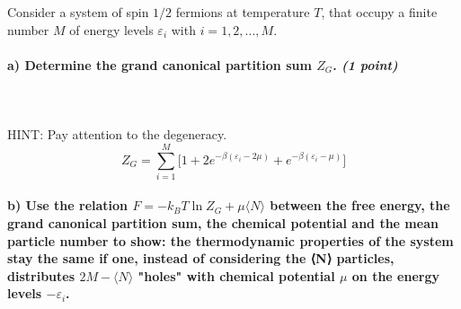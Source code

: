 Consider a system of spin $1/2$ fermions at temperature $T$, 
that occupy a finite number $M$ of energy levels 
$\varepsilon_i$ with $i=1,2,...,M$.


\paragraph{a) Determine the grand canonical partition sum $Z_G$.
    \textit{(1 point)}
} \ \\
    \\
    HINT: Pay attention to the degeneracy.
    \begin{equation}
        Z_G=
        \sum_{i=1}^M\bigg[
            1+2e^{
                -\beta(\varepsilon_i-2\mu)  %
            }+e^{
                -\beta(\varepsilon_i-\mu)
            }
        \bigg]
    \end{equation}

\paragraph{b) Use the relation $F=-k_BT\ln Z_G+\mu\langle N\rangle$
    between the free energy, the grand canonical partition 
    sum, the chemical potential and the mean particle number 
    to show: the thermodynamic properties of the system stay 
    the same if one, instead of considering the 
    ⟨N⟩ particles, distributes $2M-\langle N\rangle$ 
    "holes" with chemical potential $\mu$ on the energy levels
    $-\varepsilon_i$.
}
